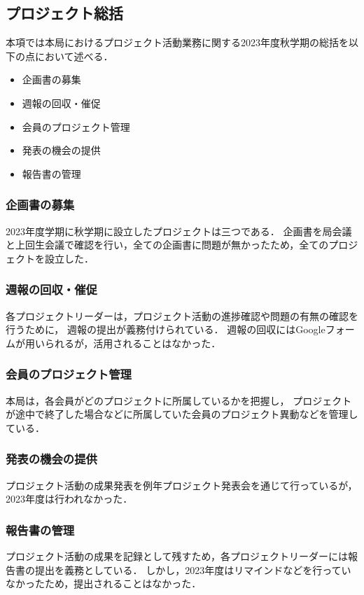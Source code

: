 \subsection*{プロジェクト総括}


本項では本局におけるプロジェクト活動業務に関する2023年度秋学期の総括を以下の点において述べる．

\begin{itemize}
  \item 企画書の募集
  \item 週報の回収・催促
  \item 会員のプロジェクト管理
  \item 発表の機会の提供
  \item 報告書の管理
\end{itemize}

\subsubsection*{企画書の募集}

2023年度学期に秋学期に設立したプロジェクトは三つである．
企画書を局会議と上回生会議で確認を行い，全ての企画書に問題が無かったため，全てのプロジェクトを設立した．

\subsubsection*{週報の回収・催促}

各プロジェクトリーダーは，プロジェクト活動の進捗確認や問題の有無の確認を行うために，
週報の提出が義務付けられている．
週報の回収にはGoogleフォームが用いられるが，活用されることはなかった．

\subsubsection*{会員のプロジェクト管理}

本局は，各会員がどのプロジェクトに所属しているかを把握し，
プロジェクトが途中で終了した場合などに所属していた会員のプロジェクト異動などを管理している．

\subsubsection*{発表の機会の提供}

プロジェクト活動の成果発表を例年プロジェクト発表会を通じて行っているが，2023年度は行われなかった．

\subsubsection*{報告書の管理}

プロジェクト活動の成果を記録として残すため，各プロジェクトリーダーには報告書の提出を義務としている．
しかし，2023年度はリマインドなどを行っていなかったため，提出されることはなかった．
